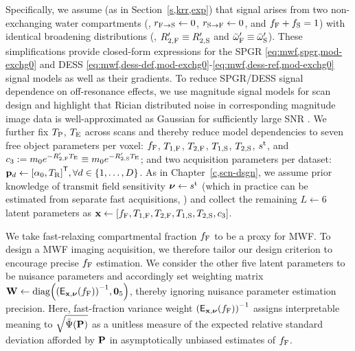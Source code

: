 Specifically,
we assume (as in Section~\ref{s,krr,exp}) 
that signal arises
from two non-exchanging water compartments
(\ie, $r_{\mathrm{F}\to\mathrm{S}} \gets 0$, $r_{\mathrm{S}\to\mathrm{F}} \gets 0$, and $f_{\mathrm{F}} + f_{\mathrm{S}} = 1$)
with identical broadening distributions
(\ie, $R_{2,\mathrm{F}}' \equiv R_{2,\mathrm{S}}'$ and $\bar{\omega}_{\mathrm{F}}' \equiv \bar{\omega}_{\mathrm{S}}'$).
These simplifications provide closed-form expressions
for the SPGR 
\eqref{eq:mwf,spgr,mod-exchg0}
and DESS 
\eqref{eq:mwf,dess-def,mod-exchg0}-\eqref{eq:mwf,dess-ref,mod-exchg0}
signal models 
as well as their gradients.
To reduce SPGR/DESS signal dependence
on off-resonance effects,
we use magnitude signal models
for scan design
and highlight 
that Rician distributed noise 
in corresponding magnitude image data
is well-approximated as Gaussian
for sufficiently large SNR \cite{gudbjartsson:95:trd}. 
We further fix $T_\mathrm{P}$, $T_\mathrm{E}$ across scans
and thereby reduce model dependencies 
to seven free object parameters per voxel:
$f_{\mathrm{F}}$, $T_{1,\mathrm{F}}$, $T_{2,\mathrm{F}}$, $T_{1,\mathrm{S}}$, $T_{2,\mathrm{S}}$, $s^{\mathrm{t}}$, and
$c_{3} := m_0 e^{-R_{2,\mathrm{F}}' T_\mathrm{E}} \equiv m_0 e^{-R_{2,\mathrm{S}}' T_\mathrm{E}}$;
and two acquisition parameters per dataset:
$\bmp_d \gets \brac{\flipnom, \TR}\tpose, \forall d \in \set{1,\dots,D}$.
As in Chapter~\ref{c,scn-dsgn},
we assume prior knowledge 
of transmit field sensitivity $\boldsymbol{\nu} \gets s^{\mathrm{t}}$ 
(which in practice can be estimated
from separate fast acquisitions, \eg \cite{sacolick:10:bmb})
and collect the remaining $L \gets 6$ latent parameters
as $\bmx \gets \brac{\ff, \tf{1}, \tf{2}, \ts{1}, \ts{2}, \const{3}}$.

We take fast-relaxing compartmental fraction $f_{\mathrm{F}}$ 
to be a proxy for MWF.
To design a MWF imaging acquisition,
we therefore tailor our design criterion
to encourage precise $f_{\mathrm{F}}$ estimation.
We consider the other five latent parameters
to be nuisance parameters
and accordingly set weighting matrix
$\bmW \gets \diag{\inv{\expect{\bmx,\bmnu}{\ff}}, \zeros{5}}$,
thereby ignoring nuisance parameter
estimation precision.
Here, 
fast-fraction variance weight 
$\inv{\expect{\bmx,\bmnu}{\ff}}$ assigns interpretable meaning
to $\sqrt{\expcost\paren{\bmP}}$
as a unitless measure
of the expected relative standard deviation 
afforded by $\mathbf{P}$ 
in asymptotically unbiased estimates of $f_{\mathrm{F}}$. 

